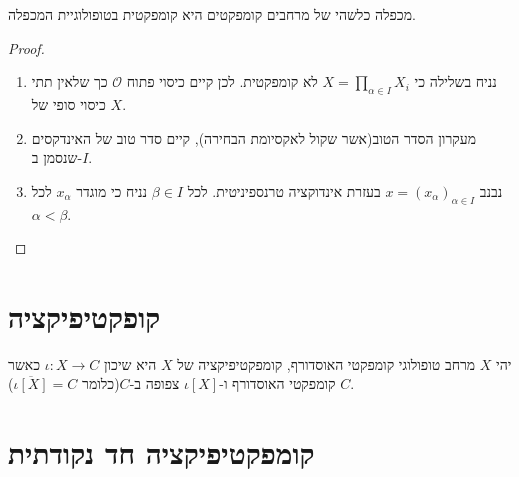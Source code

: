 \documentclass{tstextbook}
\begin{document}
\begin{theorem}[טיכונוף]
מכפלה כלשהי של מרחבים קומפקטים היא קומפקטית בטופולוגיית המכפלה.

\end{theorem}
\begin{proof}
  \begin{enumerate}
    \item נניח בשלילה כי \(X=\prod_{\alpha \in I} X_{i}\) לא קומפקטית. לכן קיים כיסוי פתוח \(\mathcal{O}\) כך שלאין תתי כיסוי סופי של \(X\). 


    \item מעקרון הסדר הטוב(אשר שקול לאקסיומת הבחירה), קיים סדר טוב של האינדקסים שנסמן ב-\(I\). 


    \item נבנב \(x=\left( x_{\alpha} \right)_{\alpha \in I}\) בעזרת אינדוקציה טרנספיניטית. לכל \(\beta \in I\) נניח כי מוגדר \(x_{\alpha}\) לכל \(\alpha<\beta\). 


  \end{enumerate}
\end{proof}
\section{קופקטיפיקציה}

\begin{definition}[קומפקטיפיקציה  ]
יהי \(X\) מרחב טופולוגי קומפקטי האוסדורף, קומפקטיפיקציה של \(X\) היא שיכון \(\iota:X\rightarrow C\) כאשר \(C\) קומפקטי האוסדורף ו-\(\iota[X]\) צפופה ב-\(C\)(כלומר \(\overline{\iota[X]}=C\)).

\end{definition}
\section{קומפקטיפיקציה חד נקודתית}
\end{document}
